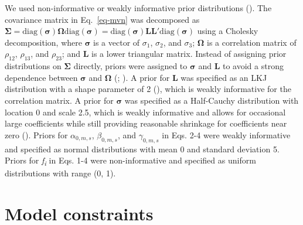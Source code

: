 \documentclass[
  12pt,
  letterpaper,
  DIV=11,
  numbers=noendperiod]{scrartcl}
\numberwithin{equation}{section}
\begin{document}
We used non-informative or weakly informative prior distributions
(). The covariance matrix in
Eq.~\ref{eq-mvn} was decomposed as
\({\boldsymbol \Sigma} = \mathrm {diag}(\boldsymbol {\sigma}){\boldsymbol \Omega}\mathrm {diag}({\boldsymbol \sigma}) = \mathrm {diag}({\boldsymbol \sigma}){\boldsymbol L}{\boldsymbol L}\prime \mathrm {diag}({\boldsymbol \sigma})\)
using a Cholesky decomposition, where \(\boldsymbol {\sigma}\) is a
vector of \(\sigma_{1}\), \(\sigma_{2}\), and \(\sigma_{3}\);
\({\boldsymbol \Omega}\) is a correlation matrix of \(\rho_{12}\),
\(\rho_{13}\), and \(\rho_{23}\); and \textbf{L} is a lower triangular
matrix. Instead of assigning prior distributions on
\(\boldsymbol{\Sigma}\) directly, priors were assigned to
\({\boldsymbol \sigma}\) and \textbf{L} to avoid a strong dependence
between \({\boldsymbol \sigma}\) and \({\boldsymbol \Omega}\)
(;
). A prior for \textbf{L}
was specified as an LKJ distribution with a shape parameter of 2
(), which is
weakly informative for the correlation matrix. A prior for
\(\boldsymbol{\sigma}\) was specified as a Half-Cauchy distribution with
location 0 and scale 2.5, which is weakly informative and allows for
occasional large coefficients while still providing reasonable shrinkage
for coefficients near zero (). Priors for \(\alpha_{0,m,s}\), \(\beta_{0,m,s}\), and
\(\gamma_{0,m,s}\) in Eqs. 2-4 were weakly informative and specified as
normal distributions with mean 0 and standard deviation 5. Priors for
\emph{f\textsubscript{i}} in Eqs. 1-4 were non-informative and specified
as uniform distributions with range (0, 1).

\newpage

\section{Model constraints}\label{model-constraints}
\end{document}
